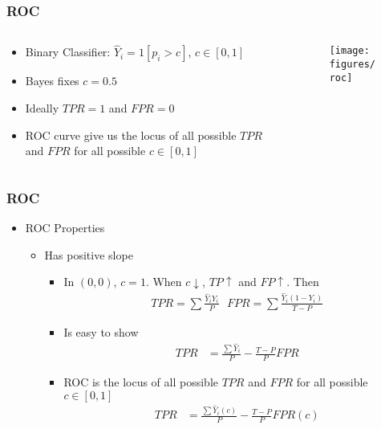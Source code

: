 \documentclass[
  shownotes,
  xcolor={svgnames},
  hyperref={colorlinks,citecolor=DarkBlue,linkcolor=DarkRed,urlcolor=DarkBlue}
  , aspectratio=169]{beamer}
\begin{document}
\begin{frame}[fragile]
\frametitle{ROC}

\begin{columns}[T] %
\begin{column}{.52\textwidth}
  \begin{itemize}
    \item Binary Classifier: $\hat{Y}_i=1[p_i>c]$, $c\in[0,1]$
    \medskip
    \item Bayes fixes $c=0.5$
    \medskip
    \item Ideally $TPR=1$  and $FPR=0$
    \medskip
    \item ROC curve give us the locus of all possible $TPR$ and $FPR$ for all possible $c\in[0,1]$
  \end{itemize}
\end{column}  
\hfill
\begin{column}{.48\textwidth}

 \begin{figure}[H] \centering
            \captionsetup{justification=centering}
              \texttt{[image: figures/roc]}                            
 \end{figure}

\end{column}
\end{columns}

\end{frame}
\begin{frame}[fragile]
\frametitle{ROC}
\begin{itemize}
  \item ROC Properties 

  \begin{itemize}
  \item Has positive slope
  \begin{itemize}
    \item In $(0,0)$, $c=1$. When $c\downarrow$, $TP \uparrow$ and $FP\uparrow$. Then
    \begin{align}
    TPR = \sum \frac{\hat{Y}_iY_i}{P} \,\,\,\, FPR = \sum \frac{\hat{Y}_i(1-Y_i)}{T-P}
    \end{align}
    \item Is easy to show
    \begin{align}
    TPR &= \frac{\sum \hat{Y}_i}{P} - \frac{T-P}{P}FPR
    \end{align}
    \item ROC is the locus of all possible $TPR$ and $FPR$ for all possible $c\in[0,1]$ 
    \begin{align}
    TPR &= \frac{\sum \hat{Y}_i(c)}{P} - \frac{T-P}{P}FPR(c)
    \end{align}
  \end{itemize}
\end{itemize}  
\end{itemize}


\end{frame}
\end{document}
